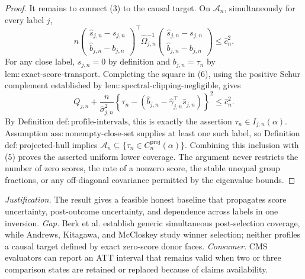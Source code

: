 \documentclass{article}
\begin{document}
\begin{proof}
It remains to connect (3) to the causal target.  On \(\mathcal A_n\), simultaneously for every label \(j\),
\[
 n
 \begin{pmatrix}\widehat s_{j,n}-s_{j,n}\\
                 \widehat b_{j,n}-b_{j,n}
 \end{pmatrix}^{\!\top}
 \widehat\Omega_{j,n}^{-1}
 \begin{pmatrix}\widehat s_{j,n}-s_{j,n}\\
                 \widehat b_{j,n}-b_{j,n}
 \end{pmatrix}
 \le\widehat c_n^2.
\tag{6}
\]
For any close label, \(s_{j,n}=0\) by definition and \(b_{j,n}=\tau_n\) by \(\mathrm{lem:exact\text{-}score\text{-}transport}\).  Completing the square in (6), using the positive Schur complement established by \(\mathrm{lem:spectral\text{-}clipping\text{-}negligible}\), gives
\[
 Q_{j,n}
 +\frac n{\widehat\sigma_{j,n}^2}
 \left\{\tau_n-\left(\widehat b_{j,n}
 -\widehat\gamma_{j,n}^{\top}\widehat s_{j,n}\right)\right\}^2
 \le\widehat c_n^2.
\]
By Definition \(\mathrm{def:profile\text{-}intervals}\), this is exactly the assertion \(\tau_n\in I_{j,n}(\alpha)\).  Assumption \(\mathrm{ass:nonempty\text{-}close\text{-}set}\) supplies at least one such label, so Definition \(\mathrm{def:projected\text{-}hull}\) implies
\(
 \mathcal A_n\subseteq\{\tau_n\in C_n^{\mathrm{proj}}(\alpha)\}
\).
Combining this inclusion with (5) proves the asserted uniform lower coverage.  The argument never restricts the number of zero scores, the rate of a nonzero score, the stable unequal group fractions, or any off-diagonal covariance permitted by the eigenvalue bounds.
\end{proof}
\par\smallskip\noindent \textit{Justification.} The result gives a feasible honest baseline that propagates score uncertainty, post-outcome uncertainty, and dependence across labels in one inversion. \textit{Gap.} Berk et al. establish generic simultaneous post-selection coverage, while Andrews, Kitagawa, and McCloskey study winner selection; neither profiles a causal target defined by exact zero-score donor faces. \textit{Consumer.} CMS evaluators can report an ATT interval that remains valid when two or three comparison states are retained or replaced because of claims availability.
\end{document}
